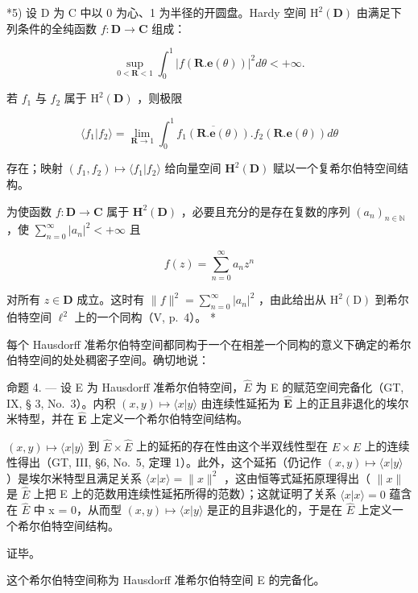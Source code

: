 *5) 设 D 为 C 中以 0 为心、1 为半径的开圆盘。Hardy 空间 \(\mathrm{H}^2 (\mathbf{D})\) 由满足下列条件的全纯函数 \(f\colon \mathbf{D}\to \mathbf{C}\) 组成：

\[
\sup _ {0 <   \mathbf {R} <   1} \int_ {0} ^ {1} | f (\mathbf {R}. \mathbf {e} (\theta)) | ^ {2} d \theta <   + \infty .
\]

若 \(f_{1}\) 与 \(f_{2}\) 属于 \(\mathrm{H}^2 (\mathbf{D})\) ，则极限

\[
\langle f _ {1} | f _ {2} \rangle = \lim _ {\mathbf {R} \rightarrow 1} \int_ {0} ^ {1} \overline {{{f _ {1} (\mathbf {R} . \mathbf {e} (\theta))}}}. f _ {2} (\mathbf {R}. \mathbf {e} (\theta)) d \theta
\]

存在；映射 \((f_1, f_2) \mapsto \langle f_1 | f_2 \rangle\) 给向量空间 \(\mathbf{H}^2(\mathbf{D})\) 赋以一个复希尔伯特空间结构。

为使函数 \(f: \mathbf{D} \to \mathbf{C}\) 属于 \(\mathbf{H}^2(\mathbf{D})\) ，必要且充分的是存在复数的序列 \((a_n)_{n \in \mathbb{N}}\) ，使 \(\sum_{n=0}^{\infty} |a_n|^2 < +\infty\) 且

\[
f (z) = \sum_ {n = 0} ^ {\infty} a _ {n} z ^ {n}
\]

对所有 \(z \in \mathbf{D}\) 成立。这时有 \(\| f\|^2 = \sum_{n=0}^{\infty} |a_n|^2\) ，由此给出从 \(\mathrm{H}^2(\mathrm{D})\) 到希尔伯特空间 \(\ell^2\) 上的一个同构（V, p.~4）。 *

每个 Hausdorff 准希尔伯特空间都同构于一个在相差一个同构的意义下确定的希尔伯特空间的处处稠密子空间。确切地说：

命题 4. --- 设 E 为 Hausdorff 准希尔伯特空间，\(\hat{E}\) 为 E 的赋范空间完备化（GT, IX, § 3, No.~3）。内积 \((x, y) \mapsto \langle x|y \rangle\) 由连续性延拓为 \(\hat{\mathbf{E}}\) 上的正且非退化的埃尔米特型，并在 \(\hat{\mathbf{E}}\) 上定义一个希尔伯特空间结构。

\((x, y) \mapsto \langle x|y \rangle\) 到 \(\hat{E} \times \hat{E}\) 上的延拓的存在性由这个半双线性型在 \(E \times E\) 上的连续性得出（GT, III, §6, No.~5, 定理 1）。此外，这个延拓（仍记作 \((x, y) \mapsto \langle x|y \rangle\) ）是埃尔米特型且满足关系 \(\langle x|x\rangle = \|x\|^2\) ，这由恒等式延拓原理得出（ \(\|x\|\) 是 \(\hat{E}\) 上把 E 上的范数用连续性延拓所得的范数）；这就证明了关系 \(\langle x|x\rangle = 0\) 蕴含在 \(\hat{E}\) 中 x = 0，从而型 \((x, y) \mapsto \langle x|y \rangle\) 是正的且非退化的，于是在 \(\hat{E}\) 上定义一个希尔伯特空间结构。

证毕。

这个希尔伯特空间称为 Hausdorff 准希尔伯特空间 E 的完备化。

